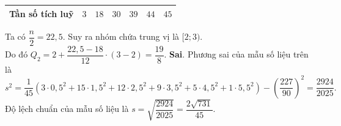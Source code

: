 \begin{ex}
{\begin{itemchoice}
\begin{center}
\begin{tabular}{|c|c|c|c|c|c|c|}
					\hline
					Tần số tích luỹ & $3$ & $18$ & $30$ & $39$ & $44$ & $45$ \\
					\hline
				\end{tabular}
			\end{center}
			Ta có $\dfrac{n}{2}=22{,}5$. Suy ra nhóm chứa trung vị là $[2;3)$. \\
			Do đó $Q_2 = 2 + \dfrac{22{,}5-18}{12}\cdot (3-2) = \dfrac{19}{8}$.
			\itemch \textbf{Sai}. Phương sai của mẫu số liệu trên là
			$$s^2 = \dfrac{1}{45}\left(3\cdot 0{,}5^2 + 15\cdot 1{,}5^2 + 12\cdot 2{,}5^2 + 9\cdot 3{,}5^2 +5\cdot 4{,}5^2 +1\cdot 5{,}5^2\right)-\left(\dfrac{227}{90}\right)^2 = \dfrac{2924}{2025}.$$
			Độ lệch chuẩn của mẫu số liệu là $s = \sqrt{\dfrac{2924}{2025}} = \dfrac{2\sqrt{731}}{45}$.
		\end{itemchoice}
	}
\end{ex}

